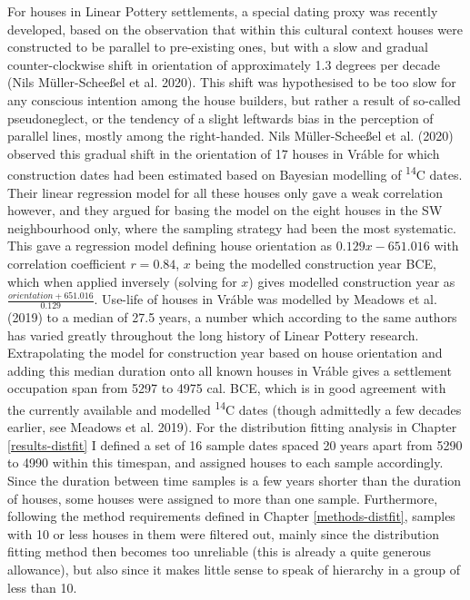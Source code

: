 \documentclass[
  12pt,
  a4paper, twoside]{book}
\begin{document}
For houses in Linear Pottery settlements, a special dating proxy was recently developed, based on the observation that within this cultural context houses were constructed to be parallel to pre-existing ones, but with a slow and gradual counter-clockwise shift in orientation of approximately 1.3 degrees per decade (Nils Müller-Scheeßel et al. 2020). This shift was hypothesised to be too slow for any conscious intention among the house builders, but rather a result of so-called pseudoneglect, or the tendency of a slight leftwards bias in the perception of parallel lines, mostly among the right-handed. Nils Müller-Scheeßel et al. (2020) observed this gradual shift in the orientation of 17 houses in Vráble for which construction dates had been estimated based on Bayesian modelling of \textsuperscript{14}C dates. Their linear regression model for all these houses only gave a weak correlation however, and they argued for basing the model on the eight houses in the SW neighbourhood only, where the sampling strategy had been the most systematic. This gave a regression model defining house orientation as \(0.129x - 651.016\) with correlation coefficient \(r = 0.84\), \(x\) being the modelled construction year BCE, which when applied inversely (solving for \(x\)) gives modelled construction year as \(\frac{orientation + 651.016}{0.129}\). Use-life of houses in Vráble was modelled by Meadows et al. (2019) to a median of 27.5 years, a number which according to the same authors has varied greatly throughout the long history of Linear Pottery research. Extrapolating the model for construction year based on house orientation and adding this median duration onto all known houses in Vráble gives a settlement occupation span from 5297 to 4975 cal. BCE, which is in good agreement with the currently available and modelled \textsuperscript{14}C dates (though admittedly a few decades earlier, see Meadows et al. 2019). For the distribution fitting analysis in Chapter \ref{results-distfit} I defined a set of 16 sample dates spaced 20 years apart from 5290 to 4990 within this timespan, and assigned houses to each sample accordingly. Since the duration between time samples is a few years shorter than the duration of houses, some houses were assigned to more than one sample. Furthermore, following the method requirements defined in Chapter \ref{methods-distfit}, samples with 10 or less houses in them were filtered out, mainly since the distribution fitting method then becomes too unreliable (this is already a quite generous allowance), but also since it makes little sense to speak of hierarchy in a group of less than 10.
\end{document}
